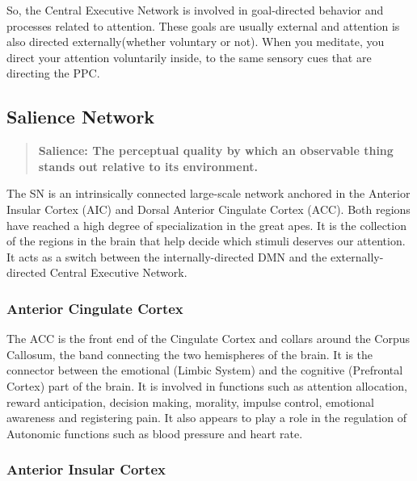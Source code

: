 \documentclass[a4paper, amsfonts, amssymb, amsmath, reprint, showkeys, nofootinbib, twoside]{revtex4-1}
\begin{document}

So, the Central Executive Network is involved in goal-directed behavior and processes 
related to attention. These goals are usually external and attention is also directed externally(whether 
voluntary or not). When you meditate, you direct your attention voluntarily
inside, to the same sensory cues that are directing the PPC.

\subsection{Salience Network}

\begin{quote}
  \textbf{Salience: The perceptual quality by which an observable thing stands out
    relative to its environment.}
\end{quote}

The SN is an intrinsically connected large-scale network anchored in the Anterior
Insular Cortex (AIC) and Dorsal Anterior Cingulate Cortex (ACC). Both regions have reached a
high degree of specialization in the great apes. It is the collection of the regions
in the brain that help decide which stimuli deserves our attention. It acts as a
switch between the internally-directed DMN and the externally-directed Central
Executive Network. \cite{saliencenetwork}

\subsubsection{Anterior Cingulate Cortex}

The ACC is the front end of the Cingulate Cortex and collars around the Corpus
Callosum, the band connecting the two hemispheres of the brain. It is the connector
between the emotional (Limbic System) and the cognitive (Prefrontal Cortex) part of
the brain. It is involved in functions such as attention allocation, reward
anticipation, decision making, morality, impulse control, emotional awareness and
registering pain. \cite{accstroop,accreward,snmorality,empathypain,acccognitive} It
also appears to play a role in the regulation of Autonomic functions such as blood
pressure and heart rate. \cite{accbloodpressure}

\subsubsection{Anterior Insular Cortex}
\end{document}
